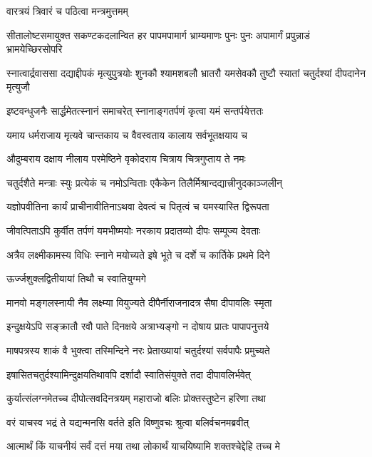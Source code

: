 \onelineshloka
{वारत्रयं त्रिवारं च पठित्वा मन्त्रमुत्तमम्} %

\threelineshloka
{सीतालोष्टसमायुक्त सकण्टकदलान्वित}
{हर पापमपामार्ग भ्राम्यमाणः पुनः पुनः}
{अपामार्गं प्रपुन्नाडं भ्रामयेच्छिरसोपरि} %

\threelineshloka
{स्नात्वार्द्रवाससा दद्याद्दीपकं मृत्युपुत्रयोः}
{शुनकौ श्यामशबलौ भ्रातरौ यमसेवकौ}
{तुष्टौ स्यातां चतुर्दश्यां दीपदानेन मृत्युजौ} %

\twolineshloka
{इष्टवन्धुजनैः सार्द्धमेतत्स्नानं समाचरेत्}
{स्नानाङ्गतर्पणं कृत्वा यमं सन्तर्पयेत्ततः} %

\twolineshloka
{यमाय धर्मराजाय मृत्यवे चान्तकाय च}
{वैवस्वताय कालाय सर्वभूतक्षयाय च} %

\twolineshloka
{औदुम्बराय दक्षाय नीलाय परमेष्ठिने}
{वृकोदराय चित्राय चित्रगुप्ताय ते नमः} %

\twolineshloka
{चतुर्दशैते मन्त्राः स्युः प्रत्येकं च नमोऽन्विताः}
{एकैकेन तिलैर्मिश्रान्दद्यात्त्रीनुदकाञ्जलीन्} %

\twolineshloka
{यज्ञोपवीतिना कार्यं प्राचीनावीतिनाऽथवा}
{देवत्वं च पितृत्वं च यमस्यास्ति द्विरूपता} %

\twolineshloka
{जीवत्पिताऽपि कुर्वीत तर्पणं यमभीष्मयोः}
{नरकाय प्रदातव्यो दीपः सम्पूज्य देवताः} %

\twolineshloka
{अत्रैव लक्ष्मीकामस्य विधिः स्नाने मयोच्यते}
{इषे भूते च दर्शे च कार्तिके प्रथमे दिने} %



\onelineshloka
{ऊर्ज्जशुक्लद्वितीयायां तिथौ च स्वातियुग्मगे} %

\twolineshloka
{मानवो मङ्गलस्नायी नैव लक्ष्म्या वियुज्यते}
{दीपैर्नीराजनादत्र सैषा दीपावलिः स्मृता} %

\twolineshloka
{इन्दुक्षयेऽपि सङ्क्रातौ रवौ पाते दिनक्षये}
{अत्राभ्यङ्गो न दोषाय प्रातः पापापनुत्तये} %

\twolineshloka
{माषपत्रस्य शाकं वै भुक्त्वा तस्मिन्दिने नरः}
{प्रेताख्यायां चतुर्दश्यां सर्वपापैः प्रमुच्यते} %

\twolineshloka
{इषासितचतुर्दश्यामिन्दुक्षयतिथावपि}
{दर्शादौ स्वातिसंयुक्ते तदा दीपावलिर्भवेत्} %

\twolineshloka
{कुर्यात्संलग्नमेतच्च दीपोत्सवदिनत्रयम्}
{महाराजो बलिः प्रोक्तस्तुष्टेन हरिणा तथा} %

\twolineshloka
{वरं याचस्व भद्रं ते यद्यन्मनसि वर्तते}
{इति विष्णुवचः श्रुत्वा बलिर्वचनमब्रवीत्} %

\twolineshloka
{आत्मार्थं किं याचनीयं सर्वं दत्तं मया तथा}
{लोकार्थं याचयिष्यामि शक्तश्चेद्देहि तच्च मे} %

